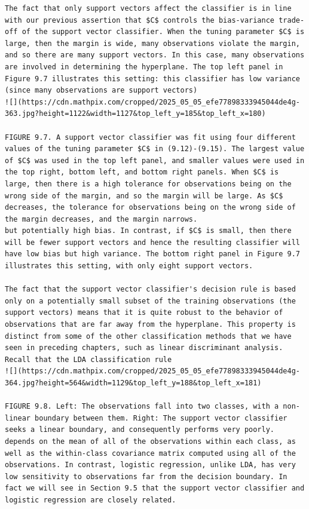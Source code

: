 \documentclass[10pt]{article}
\begin{document}
\begin{verbatim}
The fact that only support vectors affect the classifier is in line with our previous assertion that $C$ controls the bias-variance trade-off of the support vector classifier. When the tuning parameter $C$ is large, then the margin is wide, many observations violate the margin, and so there are many support vectors. In this case, many observations are involved in determining the hyperplane. The top left panel in Figure 9.7 illustrates this setting: this classifier has low variance (since many observations are support vectors)
![](https://cdn.mathpix.com/cropped/2025_05_05_efe77898333945044de4g-363.jpg?height=1122&width=1127&top_left_y=185&top_left_x=180)

FIGURE 9.7. A support vector classifier was fit using four different values of the tuning parameter $C$ in (9.12)-(9.15). The largest value of $C$ was used in the top left panel, and smaller values were used in the top right, bottom left, and bottom right panels. When $C$ is large, then there is a high tolerance for observations being on the wrong side of the margin, and so the margin will be large. As $C$ decreases, the tolerance for observations being on the wrong side of the margin decreases, and the margin narrows.
but potentially high bias. In contrast, if $C$ is small, then there will be fewer support vectors and hence the resulting classifier will have low bias but high variance. The bottom right panel in Figure 9.7 illustrates this setting, with only eight support vectors.

The fact that the support vector classifier's decision rule is based only on a potentially small subset of the training observations (the support vectors) means that it is quite robust to the behavior of observations that are far away from the hyperplane. This property is distinct from some of the other classification methods that we have seen in preceding chapters, such as linear discriminant analysis. Recall that the LDA classification rule
![](https://cdn.mathpix.com/cropped/2025_05_05_efe77898333945044de4g-364.jpg?height=564&width=1129&top_left_y=188&top_left_x=181)

FIGURE 9.8. Left: The observations fall into two classes, with a non-linear boundary between them. Right: The support vector classifier seeks a linear boundary, and consequently performs very poorly.
depends on the mean of all of the observations within each class, as well as the within-class covariance matrix computed using all of the observations. In contrast, logistic regression, unlike LDA, has very low sensitivity to observations far from the decision boundary. In fact we will see in Section 9.5 that the support vector classifier and logistic regression are closely related.


\end{verbatim}
\end{document}
